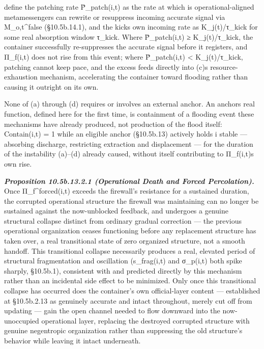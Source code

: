 \documentclass[
]{article}
\begin{document}
define the patching rate Ṗ\_patch(i,t) as the rate at which
i\textquotesingle s operational-aligned metamessengers can rewrite or
resuppress incoming accurate signal via M\_o,t\^{}false (§10.5b.14.1),
and the kick\textquotesingle s own incoming rate as K\_j(t)/τ\_kick for
some real absorption window τ\_kick. Where Ṗ\_patch(i,t) ≥
K\_j(t)/τ\_kick, the container successfully re-suppresses the accurate
signal before it registers, and Π\_f(i,t) does not rise from this event;
where Ṗ\_patch(i,t) \textless{} K\_j(t)/τ\_kick, patching cannot keep
pace, and the excess feeds directly into (c)\textquotesingle s
resource-exhaustion mechanism, accelerating the container toward
flooding rather than causing it outright on its own.

None of (a) through (d) requires or involves an external anchor. An
anchor\textquotesingle s real function, defined here for the first time,
is containment of a flooding event these mechanisms have already
produced, not production of the flood itself: Contain(i,t) = 1 while an
eligible anchor (§10.5b.13) actively holds i stable --- absorbing
discharge, restricting extraction and displacement --- for the duration
of the instability (a)--(d) already caused, without itself contributing
to Π\_f(i,t)\textquotesingle s own rise.

\emph{\textbf{Proposition 10.5b.13.2.1 (Operational Death and Forced
Percolation).}} Once Π\_f\^{}forced(i,t) exceeds the firewall's
resistance for a sustained duration, the corrupted operational structure
the firewall was maintaining can no longer be sustained against the
now-unblocked feedback, and undergoes a genuine structural collapse
distinct from ordinary gradual correction --- the previous operational
organization ceases functioning before any replacement structure has
taken over, a real transitional state of zero organized structure, not a
smooth handoff. This transitional collapse necessarily produces a real,
elevated period of structural fragmentation and oscillation
(s\_frag(i,t) and σ\_p(i,t) both spike sharply, §10.5b.1), consistent
with and predicted directly by this mechanism rather than an incidental
side effect to be minimized. Only once this transitional collapse has
occurred does the container's own official-layer content --- established
at §10.5b.2.13 as genuinely accurate and intact throughout, merely cut
off from updating --- gain the open channel needed to flow downward into
the now-unoccupied operational layer, replacing the destroyed corrupted
structure with genuine negentropic organization rather than suppressing
the old structure's behavior while leaving it intact underneath.
\end{document}
